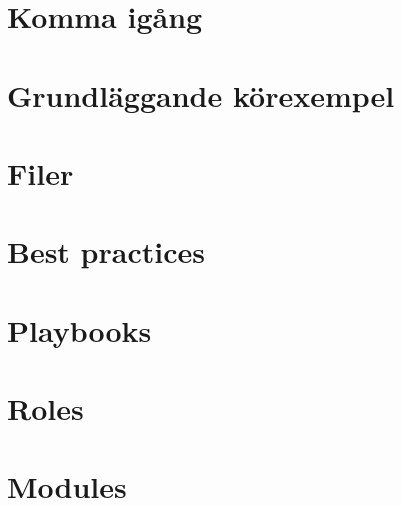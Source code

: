\pagestyle{plain}

\setcounter{page}{1}
\chapter{Komma igång}\label{sec:intro}


\chapter{Grundläggande körexempel}\label{sec:basicexamples}


\chapter{Filer}\label{sec:files}


\chapter{Best practices}\label{sec:bestpractices}


\chapter{Playbooks}\label{sec:playbooks}


\chapter{Roles}\label{sec:roles}


\chapter{Modules}\label{sec:modules}


